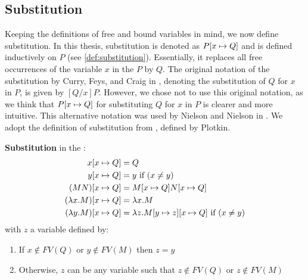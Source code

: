 \subsection{Substitution}
\label{sec:substitution}
Keeping the definitions of free and bound variables in mind, we now define substitution.
In this thesis, substitution is denoted as $P [{x}\mapsto{Q}]$ and is defined inductively on $P$ (see \cref{def:substitution}).
Essentially, it replaces all free occurrences of the variable $x$ in the \lterm $P$ by \lterm $Q$.
The original notation of the substitution by Curry, Feys, and Craig in \cite{CurryFeysCraig1958}, denoting the substitution of $Q$ for $x$ in $P$, is given by $[Q/x]P$.
However, we chose not to use this original notation, as we think that $P [{x}\mapsto{Q}]$ for substituting $Q$ for $x$ in $P$ is clearer and more intuitive.
This alternative notation was used by Nielson and Nielson in \cite{wiley}. 
We adopt the definition of substitution from \cite{PLOTKIN1975125}, defined by Plotkin. 

\begin{definition}
  \label{def:substitution}
  \textbf{Substitution} in the \lc:
    \begin{align*}
 x [{x}\mapsto{Q}]             &= Q \\
 y [{x}\mapsto{Q}]             &= y \text{ if } (x \neq y) \\
 (M N) [{x}\mapsto{Q}]         &= M [{x}\mapsto{Q}] N [{x}\mapsto{Q}] \\
 (\lambda {x}.{M}) [{x}\mapsto{Q}] &= \lambda {x}.{M} \\
 (\lambda {y}.{M}) [{x}\mapsto{Q}] &= \lambda {z}.{M [{y}\mapsto{z}][{x}\mapsto{Q}]} \text{ if } (x \neq y) 
    \end{align*}
 with $z$ a variable defined by:
  \begin{enumerate}
    \item%
 If $x \notin FV(Q)$ or $y \notin FV(M)$ then $z = y$
    \item%
 Otherwise, $z$ can be any variable such that $z \notin FV(Q)$ or $z \notin FV(M)$
  \end{enumerate}
\end{definition}


  



